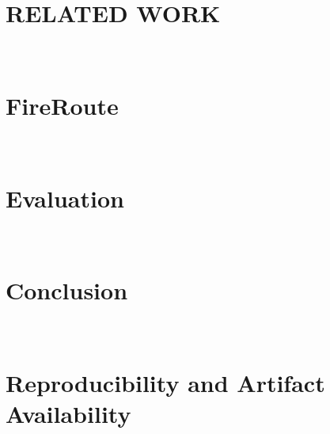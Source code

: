 \documentclass[conference]{IEEEtran}
\begin{document}
\section{RELATED WORK}~\label{sec:background}

\section{FireRoute}~\label{sec:methodology}

\section{Evaluation}~\label{sec:evaluation}

\section{Conclusion}~\label{sec:conclusion}

\section*{Reproducibility and Artifact Availability}



\balance


\end{document}
